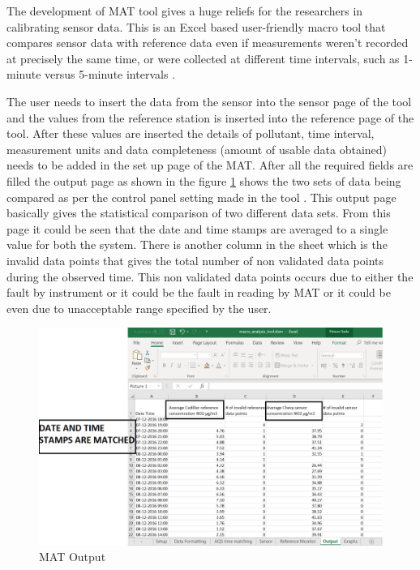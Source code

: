 The development of MAT tool gives a huge reliefs for the researchers in calibrating sensor data. This is an Excel based user-friendly macro tool that compares sensor data with reference data \cite{National2017} even if measurements weren’t recorded at precisely the same time, or were collected at different time intervals, such as 1-minute versus 5-minute intervals \cite{mattool}. 

The user needs to insert the data from the sensor into the sensor page of the tool and the values from the reference station is inserted into the reference page of the tool. After these values are inserted the details of pollutant, time interval, measurement units and data completeness (amount of usable data obtained) needs to be added in the set up page of the MAT. After all the required fields are filled the output page as shown in the figure \ref{MAT} shows the two sets of data being compared as per the control panel setting made in the tool \cite{National2017}.
This output page basically gives the statistical comparison of two different data sets. From this page it could be seen that the date and time stamps are averaged to a single value for both the system. There is another column in the sheet which is the invalid data points that gives the total number of non validated data points during the observed time. This non validated data points occurs due to either the fault by instrument or it could be the fault in reading by MAT or it could be even due to unacceptable range specified by the user.

\begin{figure}[h]
    \begin{center}
    \includegraphics[scale=0.35]{./images/figure6.png}
    \end{center}
    \caption{MAT Output}
    \label{MAT}
  \end{figure}

